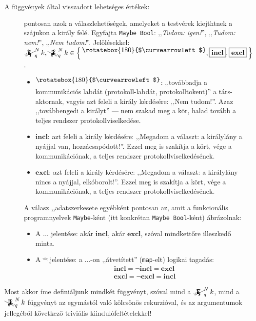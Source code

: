 \documentclass{article}
\newcommand{\nothing}{\text{\raisebox{0.4em}{\rotatebox{180}{$\curvearrowleft$}}}}%
\newcommand{\just}[1]{\boxed{#1}}%
\newcommand{\incl}{\mathbf{incl}}
\newcommand{\excl}{\mathbf{excl}}
\newcommand{\setOf}[1]{\left\lbrace\,#1\,\right\rbrace}
\newcommand{\mainfunA}[3]{\mathwitch_{#2}^{#1}#3}
\newcommand{\mainfunB}[3]{\reversemathwitch_{#2}^{#1}#3}
\begin{document}
\begin{description}
		\item[A függvények által visszadott lehetséges értékek:] pontosan azok a válaszlehetőségek, amelyeket a testvérek kiejthtnek a szájukon a király felé. Egyfajta \texttt{Maybe Bool}: ,,\textit{Tudom: igen!}'', ,,\textit{Tudom: nem!}'', ,,\textit{Nem tudom!}''. Jelölésekkel: $\mainfunA Nqk, \mainfunB Nqk \in \setOf{\nothing, \just\incl, \just\excl}$.
		\begin{itemize}
			\item $\nothing$: ,,továbbadja a kommunikációs labdát (protokoll-labdát, protokolltokent)'' a társ-aktornak, vagyis azt feleli a király kérdésére: ,,Nem tudom!''.  Azaz ,,továbbengedi a királyt'' --- nem szakad meg a kör, halad tovább a teljes rendszer protokollviselkedése.
			\item $\just\incl$: azt feleli a király kérdésére: ,,Megadom a választ:  a királylány a nyájjal van, hozzácsapódott!''. Ezzel meg is szakítja a kört, vége a kommunikációnak, a teljes rendszer protokollviselkedésének.
			\item $\just\excl$: azt feleli a király kérdésére: ,,Megadom a választ:  a királylány nincs a nyájjal, elkóborolt!''. Ezzel meg is szakítja a kört, vége a kommunikációnak, a teljes rendszer protokollviselkedésének.
		\end{itemize}
		A válasz ,,adatszerkesete egyébként pontosan az, amit a funkcionális programnyelvek \texttt{Maybe}-ként (itt konkrétan \texttt{Maybe Bool}-ként) ábrázolnak:
		\begin{itemize}
			\item A $\just{\dots}$ jelentése: akár $\just\incl$, akár $\just\excl$, szóval mindkettőre illeszkedő minta.
			\item A $\hat\lnot$ jelentése: a $\just\dots$-on ,,átvetített'' (\texttt{map}-elt) logikai tagadás:
			\begin{align*}
				\mathop{\hat\lnot}\just\incl = \just{\lnot\incl} = \just\excl\\
				\mathop{\hat\lnot}\just\excl = \just{\lnot\excl} = \just\incl
			\end{align*}
		\end{itemize}
	\end{description} 
	
	Most akkor íme definiáljunk mindkét függvényt, szóval mind a $\mainfunA Nqk$, mind a $\mainfunB Nqk$ függvényt az egymástól való kölcsönös rekurzióval, és az argumentumok jellegéből következő triviális kiindulófeltételekkel!
\end{document}
